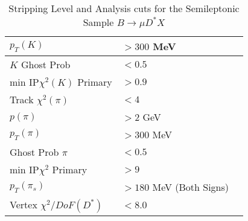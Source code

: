 \begin{table}[t]
\begin{center}
\begin{tabular}{l l l }
			$p_T(K)$ & $>300$ MeV & \\ \hline
			$K$ Ghost Prob &$<0.5$ & \\ \hline 
			min IP$\chi^2(K)$ Primary & $>0.9$ & \\ \hline
			Track $\chi^2(\pi)$ &$<4$ &  \\ \hline
			$p(\pi)$ &$> 2$ GeV& \\ \hline
			$p_T(\pi)$ &$> 300$ MeV& \\ \hline
			Ghost Prob $\pi$ & $<0.5$ & \\ \hline
			min IP$\chi^2$ Primary & $>9$& \\ \hline
			$p_T(\pi_s)$ & $>180$ MeV (Both Signs)& \\ \hline
			Vertex $\chi^2/DoF(D^*)$ &$ <8.0$ & \\ 
			\hline
			\hline\hline
		\end{tabular}
	\end{center}
	\caption{Stripping Level and Analysis cuts for the Semileptonic Sample $B\to\mu D^* X$}
	\label{table:B2MuXAnalysisCuts}

\end{table}
